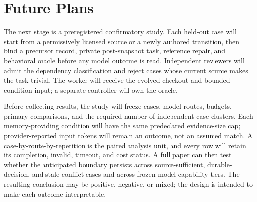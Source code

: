 \documentclass[10pt,conference]{IEEEtran}
\begin{document}
\section{Future Plans}

The next stage is a preregistered confirmatory study. Each held-out case will
start from a permissively licensed source or a newly authored transition, then
bind a precursor record, private post-snapshot task, reference repair, and
behavioral oracle before any model outcome is read. Independent reviewers will
admit the dependency classification and reject cases whose current source makes
the task trivial. The worker will receive the evolved checkout and bounded
condition input; a separate controller will own the oracle.

Before collecting results, the study will freeze cases, model routes, budgets,
primary comparisons, and the required number of independent case clusters.
Each memory-providing condition will have the same predeclared evidence-size
cap; provider-reported input tokens will remain an outcome, not an assumed
match. A case-by-route-by-repetition is the paired analysis unit, and every row
will retain its completion, invalid, timeout, and cost status. A full paper can
then test whether the anticipated boundary persists across source-sufficient,
durable-decision, and stale-conflict cases and across frozen model capability
tiers. The resulting conclusion may be positive, negative, or mixed; the
design is intended to make each outcome interpretable.



\end{document}
